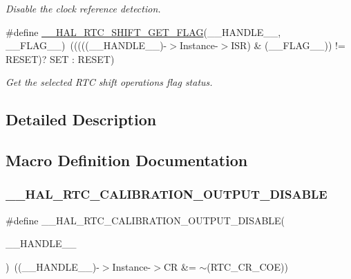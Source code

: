 \begin{DoxyCompactItemize}
\begin{DoxyCompactList}\small\item\em Disable the clock reference detection. \end{DoxyCompactList}\item 
\#define \hyperlink{group___r_t_c_ex___calibration_ga5e1482310c213248d8416b24a5e6b3f3}{\+\_\+\+\_\+\+H\+A\+L\+\_\+\+R\+T\+C\+\_\+\+S\+H\+I\+F\+T\+\_\+\+G\+E\+T\+\_\+\+F\+L\+AG}(\+\_\+\+\_\+\+H\+A\+N\+D\+L\+E\+\_\+\+\_\+,  \+\_\+\+\_\+\+F\+L\+A\+G\+\_\+\+\_\+)~(((((\+\_\+\+\_\+\+H\+A\+N\+D\+L\+E\+\_\+\+\_\+)-\/$>$Instance-\/$>$I\+SR) \& (\+\_\+\+\_\+\+F\+L\+A\+G\+\_\+\+\_\+)) != R\+E\+S\+ET)? S\+ET \+: R\+E\+S\+ET)
\begin{DoxyCompactList}\small\item\em Get the selected R\+TC shift operation\textquotesingle{}s flag status. \end{DoxyCompactList}\end{DoxyCompactItemize}


\subsection{Detailed Description}


\subsection{Macro Definition Documentation}
\mbox{\label{group___r_t_c_ex___calibration_gab5c03b27e1117cf17be5df483b1211b8}} 
\subsubsection{\texorpdfstring{\+\_\+\+\_\+\+H\+A\+L\+\_\+\+R\+T\+C\+\_\+\+C\+A\+L\+I\+B\+R\+A\+T\+I\+O\+N\+\_\+\+O\+U\+T\+P\+U\+T\+\_\+\+D\+I\+S\+A\+B\+LE}{\_\_HAL\_RTC\_CALIBRATION\_OUTPUT\_DISABLE}}
{\footnotesize\ttfamily \#define \+\_\+\+\_\+\+H\+A\+L\+\_\+\+R\+T\+C\+\_\+\+C\+A\+L\+I\+B\+R\+A\+T\+I\+O\+N\+\_\+\+O\+U\+T\+P\+U\+T\+\_\+\+D\+I\+S\+A\+B\+LE(\begin{DoxyParamCaption}\item[{}]{\+\_\+\+\_\+\+H\+A\+N\+D\+L\+E\+\_\+\+\_\+ }\end{DoxyParamCaption})~((\+\_\+\+\_\+\+H\+A\+N\+D\+L\+E\+\_\+\+\_\+)-\/$>$Instance-\/$>$CR \&= $\sim$(R\+T\+C\+\_\+\+C\+R\+\_\+\+C\+OE))}



